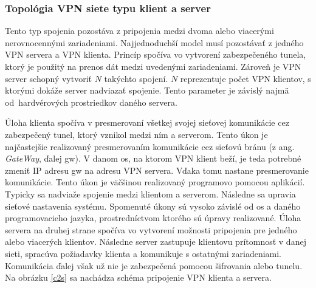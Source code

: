 \subsubsection{Topológia VPN siete typu klient a server}
Tento typ spojenia pozostáva z pripojenia medzi dvoma alebo viacerými nerovnocennými zariadeniami. Najjednoduchší model musí pozostávať z jedného VPN servera a VPN klienta. Princíp spočíva vo vytvorení zabezpečeného tunela, ktorý je použitý na prenos dát medzi uvedenými zariadeniami. Zároveň je VPN server schopný vytvoriť $N$ takýchto spojení. $N$ reprezentuje počet VPN klientov, s ktorými dokáže server nadviazať spojenie. Tento parameter je závislý najmä od~hardvérových prostriedkov daného servera.

Úloha klienta spočíva v presmerovaní všetkej svojej sieťovej komunikácie cez zabezpečený tunel, ktorý vznikol medzi ním a serverom. Tento úkon je najčastejšie realizovaný presmerovaním komunikácie cez sieťovú bránu (z ang. \textit{GateWay}, ďalej \acrshort{gw}). V danom \acrshort{os}, na ktorom VPN klient beží, je teda potrebné zmeniť IP adresu \acrshort{gw} na adresu VPN servera. Vďaka tomu nastane presmerovanie komunikácie. Tento úkon je väčšinou realizovaný programovo pomocou aplikácií. Typicky sa nadviaže spojenie medzi klientom a serverom. Následne sa upravia sieťové nastavenia systému. Spomenuté úkony sú vysoko závislé od \acrshort{os} a daného programovacieho jazyka, prostredníctvom ktorého sú úpravy realizované. 
Úloha servera na druhej strane spočíva vo vytvorení možnosti pripojenia pre jedného alebo viacerých klientov. Následne server zastupuje klientovu prítomnosť v danej sieti, spracúva požiadavky klienta a komunikuje s ostatnými zariadeniami. Komunikácia ďalej však už nie je zabezpečená pomocou šifrovania alebo tunelu. Na obrázku \ref{c2s} sa nachádza schéma pripojenie VPN klienta a servera.   

